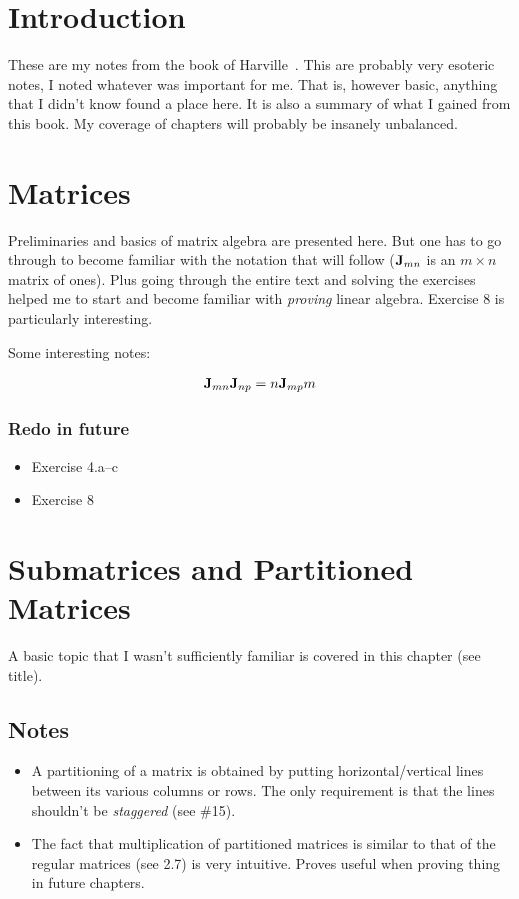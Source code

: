 \documentclass[a4paper, oneside]{book}
\begin{document}
\chapter*{Introduction}

These are my notes from the book of Harville~\cite{harville97}. This are probably very esoteric notes, I noted whatever was important for me. That is, however basic, anything that I didn't know found a place here. It is also a summary of what I gained from this book. My coverage of chapters will probably be insanely unbalanced.

\chapter{Matrices}
Preliminaries and basics of matrix algebra are presented here. But one has to go through to become familiar with the notation that will follow (\eg $\mathbf{J}_{mn}$ is an $m\times n$ matrix of ones). Plus going through the entire text and solving the exercises helped me to start and become familiar with \textit{proving} linear algebra. Exercise 8 is particularly interesting.

Some interesting notes:

\begin{align*}
\mathbf{J}_{mn} \mathbf{J}_{np} = n \mathbf{J}_{mp}m
\end{align*}

\subsection{Redo in future}
\begin{itemize}
\item Exercise 4.a--c
\item Exercise 8
\end{itemize}

\chapter{Submatrices and Partitioned Matrices}
A basic topic that I wasn't sufficiently familiar is covered in this chapter (see title). 

\section*{Notes}
\begin{itemize}
\item A partitioning of a matrix is obtained by putting horizontal/vertical lines between its various columns or rows. The only requirement is that the lines shouldn't be \textit{staggered} (see \#15). 
\item The fact that multiplication of partitioned matrices is similar to that of the regular matrices (see 2.7) is very intuitive. Proves useful when proving thing in future chapters.
\end{itemize}
\end{document}
